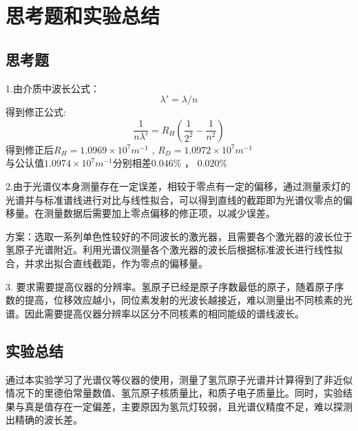 \documentclass{report}
\begin{document}
	\section{思考题和实验总结}
\subsection{思考题}
1.由介质中波长公式：
\begin{equation}
	\lambda'=\lambda/n \nonumber
\end{equation}
得到修正公式:
\begin{equation}
		\frac{1}{n\lambda'}=R_H(\frac{1}{2^2}-\frac{1}{n^2}) \nonumber
\end{equation}
得到修正后$ R_H=1.0969\times10^7m^{-1} $ , $ R_D=1.0972\times10^7m^{-1} $\\
与公认值$ 1.0974\times10^7m^{-1} $分别相差$ 0.046\% $ ， $ 0.020\% $


2.由于光谱仪本身测量存在一定误差，相较于零点有一定的偏移，通过测量汞灯的光谱并与标准谱线进行对比与线性拟合，可以得到直线的截距即为光谱仪零点的偏移量。在测量数据后需要加上零点偏移的修正项，以减少误差。


方案：选取一系列单色性较好的不同波长的激光器，且需要各个激光器的波长位于氢原子光谱附近。利用光谱仪测量各个激光器的波长后根据标准波长进行线性拟合，并求出拟合直线截距，作为零点的偏移量。


3.	要求需要提高仪器的分辨率。氢原子已经是原子序数最低的原子，随着原子序数的提高，位移效应越小，同位素发射的光波长越接近，难以测量出不同核素的光谱。因此需要提高仪器分辨率以区分不同核素的相同能级的谱线波长。

\subsection{实验总结}
通过本实验学习了光谱仪等仪器的使用，测量了氢氘原子光谱并计算得到了非近似情况下的里德伯常量数值、氢氘原子核质量比，和质子电子质量比。同时，实验结果与真是值存在一定偏差，主要原因为氢氘灯较弱，且光谱仪精度不足，难以探测出精确的波长差。
\end{document}
